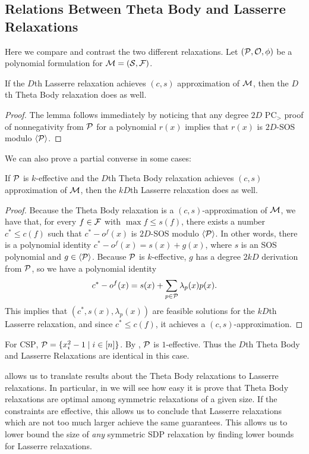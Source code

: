 \subsection{Relations Between Theta Body and Lasserre Relaxations}
Here we compare and contrast the two different relaxations. Let $(\mathcal P, \mathcal O, \phi)$ be a polynomial formulation for $\mathcal M = (\mathcal S, \mathcal F)$.
\begin{lemma}
If the $D$th Lasserre relaxation achieves $(c,s)$ approximation of $\mathcal M$, then the $D$th Theta Body relaxation does as well.
\end{lemma}
\begin{proof}
The lemma follows immediately by noticing that any degree $2D$ PC$_>$ proof of nonnegativity from $\mathcal P$ for a polynomial $r(x)$ implies that $r(x)$ is $2D$-SOS modulo $\langle \mathcal P \rangle$.
\end{proof}
We can also prove a partial converse in some cases:
\begin{proposition}\label{prop:tb_to_sos}
If $\mathcal P$ is $k$-effective and the $D$th Theta Body relaxation achieves $(c,s)$ approximation of $\mathcal M$, then the $kD$th Lasserre relaxation does as well.
\end{proposition}
\begin{proof}
Because the Theta Body relaxation is a $(c,s)$-approximation of $\mathcal M$, we have that, for every $f \in \mathcal F$ with $\max f \leq s(f)$, there exists a number $c^* \leq c(f)$ such that $c^* - o^f(x)$ is $2D$-SOS modulo $\langle \mathcal P \rangle$. In other words, there is a polynomial identity $c^* - o^f(x) = s(x) + g(x)$, where $s$ is an SOS polynomial and $g \in \langle \mathcal P \rangle$. Because $\mathcal P$ is $k$-effective, $g$ has a degree $2kD$ derivation from $\mathcal P$, so we have a polynomial identity
\[c^* - o^f(x) = s(x) + \sum_{p \in \mathcal P} \lambda_p(x)p(x).\]
This implies that $(c^*, s(x), \lambda_p(x))$ are feasible solutions for the $kD$th Lasserre relaxation, and since $c^* \leq c(f)$, it achieves a $(c,s)$-approximation.
\end{proof}
\begin{example}
For \textsc{CSP}, $\mathcal P = \{x_i^2 - 1 \mid i \in [n]\}$. By , $\mathcal P$ is $1$-effective. Thus the $D$th Theta Body and Lasserre Relaxations are identical in this case.
\end{example}
 allows us to translate results about the Theta Body relaxations to Lasserre relaxations. In particular, in  we will see how easy it is  prove that Theta Body relaxations are optimal among symmetric relaxations of a given size. If the constraints are effective, this allows us to conclude that Lasserre relaxations which are not too much larger achieve the same guarantees. This allows us to lower bound the size of \emph{any} symmetric SDP relaxation by finding lower bounds for Lasserre relaxations.

